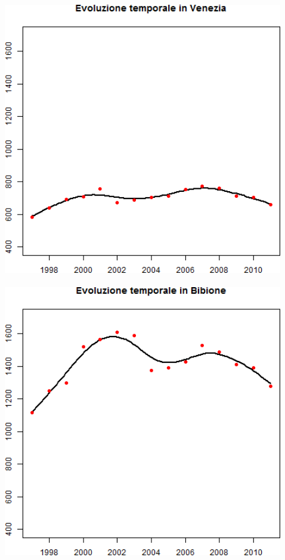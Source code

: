 \documentclass[landscape,9pt]{beamer}                           %
\begin{document}
\begin{frame}
\begin{columns}
\begin{column}{0.225\textwidth}
	\end{column}
	\begin{column}{0.225\textwidth}
	\includegraphics[width=1\textwidth]{Immagini/VeneziaCovar/Venezia.png}
	\ \
	\newline
	\includegraphics[width=1\textwidth]{Immagini/VeneziaCovar/Bibione.png}
	\end{column}
	\begin{column}{0.35\textwidth}	
		\begin{center}		
		\end{center}
	\end{column}
\end{columns}
\end{frame}
\end{document}
